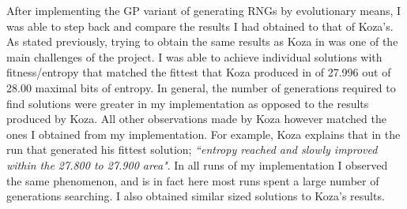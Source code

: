 \documentclass[a4paper,10.5pt]{article}
\begin{document}
After implementing the GP variant of generating RNGs by evolutionary means, I was able to step back and compare the results I had obtained to that of Koza's. As stated previously, trying to obtain the same results as Koza in \cite{kozarng} was one of the main challenges of the project. I was able to achieve individual solutions with fitness/entropy that matched the fittest that Koza produced in \cite[p.6]{kozarng} of 27.996 out of 28.00 maximal bits of entropy. In general, the number of generations required to find solutions were greater in my implementation as opposed to the results produced by Koza. All other observations made by Koza however matched the ones I obtained from my implementation. For example, Koza explains that in the run that generated his fittest solution; \emph{``entropy reached and slowly improved within the 27.800 to 27.900 area"}. In all runs of my implementation I observed the same phenomenon, and is in fact here most runs spent a large number of generations searching. I also obtained similar sized solutions to Koza's results.
\end{document}
